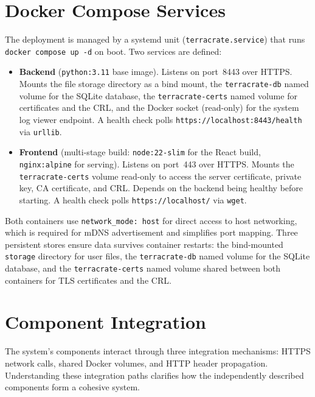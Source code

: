 \documentclass[12pt,letterpaper]{report}
\begin{document}
\section{Docker Compose Services}

The deployment is managed by a systemd unit (\texttt{terracrate.service}) that runs \texttt{docker compose up -d} on boot. Two services are defined:

\begin{itemize}
    \item \textbf{Backend} (\texttt{python:3.11} base image). Listens on port~8443 over HTTPS. Mounts the file storage directory as a bind mount, the \texttt{terracrate-db} named volume for the SQLite database, the \texttt{terracrate-certs} named volume for certificates and the CRL, and the Docker socket (read-only) for the system log viewer endpoint. A health check polls \texttt{https://localhost:8443/health} via \texttt{urllib}.

    \item \textbf{Frontend} (multi-stage build: \texttt{node:22-slim} for the React build, \texttt{nginx:alpine} for serving). Listens on port~443 over HTTPS. Mounts the \texttt{terracrate-certs} volume read-only to access the server certificate, private key, CA certificate, and CRL. Depends on the backend being healthy before starting. A health check polls \texttt{https://localhost/} via \texttt{wget}.
\end{itemize}

Both containers use \texttt{network\_mode: host} for direct access to host networking, which is required for mDNS advertisement and simplifies port mapping. Three persistent stores ensure data survives container restarts: the bind-mounted \texttt{storage} directory for user files, the \texttt{terracrate-db} named volume for the SQLite database, and the \texttt{terracrate-certs} named volume shared between both containers for TLS certificates and the CRL.

\section{Component Integration}

The system's components interact through three integration mechanisms: HTTPS network calls, shared Docker volumes, and HTTP header propagation. Understanding these integration paths clarifies how the independently described components form a cohesive system.
\end{document}
